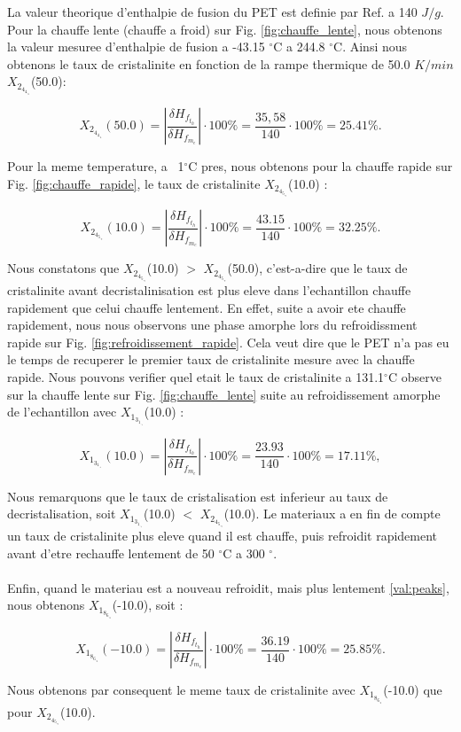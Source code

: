 La valeur theorique d'enthalpie de fusion du PET est definie par Ref. \cite{petnet} a 140 $J/g$. Pour la chauffe lente (chauffe a froid) sur Fig. \ref{fig:chauffe_lente}, nous obtenons la valeur mesuree d'enthalpie de fusion a -43.15 $^\circ$C a 244.8 $^\circ$C. Ainsi nous obtenons le taux de cristalinite en fonction de la rampe thermique de 50.0 $K/min$ $X_2_4_4_._8$(50.0):

\[
	X_2_4_4_._8(50.0) = |\frac{\delta H_f_t_h}{\delta H_f_m_e}| \cdot 100\% = \frac{35,58}{140} \cdot 100 \% = 25.41 \%.
\]

Pour la meme temperature, a ~1$^\circ$C pres, nous obtenons pour la chauffe rapide sur Fig. \ref{fig:chauffe_rapide}, le taux de cristalinite $X_2_4_5_._9$(10.0) :

\[
	X_2_4_5_._9(10.0) = |\frac{\delta H_f_t_h}{\delta H_f_m_e}| \cdot 100\% = \frac{43.15}{140} \cdot 100\% = 32.25 \%.
\]

Nous constatons que $X_2_4_5_._9$(10.0) $>$ $X_2_4_5_._9$(50.0), c'est-a-dire que le taux de cristalinite avant decristalinisation est plus eleve dans l'echantillon chauffe rapidement que celui chauffe lentement. En effet, suite a avoir ete chauffe rapidement, nous nous observons une phase amorphe lors du refroidissment rapide sur Fig. \ref{fig:refroidissement_rapide}. Cela veut dire que le PET n'a pas eu le temps de recuperer le premier taux de cristalinite mesure avec la chauffe rapide. Nous pouvons verifier quel etait le taux de cristalinite a 131.1$^\circ$C observe sur la chauffe lente sur Fig. \ref{fig:chauffe_lente} suite au refroidissement amorphe de l'echantillon avec $X_1_3_1_._1$(10.0) :


\[
	X_1_3_1_._1(10.0) = |\frac{\delta H_f_t_h}{\delta H_f_m_e}| \cdot 100\% = \frac{23.93}{140} \cdot 100\% = 17.11 \%,
\]

Nous remarquons que le taux de cristalisation est inferieur au taux de decristalisation, soit $X_1_3_1_._1$(10.0) $<$ $X_2_4_5_._9$(10.0). Le materiaux a en fin de compte un taux de cristalinite plus eleve quand il est chauffe, puis refroidit rapidement avant d'etre rechauffe lentement de 50 $^\circ$C a 300 $^\circ$.
\\\\
Enfin, quand le materiau est a nouveau refroidit, mais plus lentement \ref{val:peaks}, nous obtenons $X_1_8_6_._8$(-10.0), soit : 

\[
        X_1_8_6_._8(-10.0) = |\frac{\delta H_f_t_h}{\delta H_f_m_e}| \cdot 100\% = \frac{36.19}{140} \cdot 100\% = 25.85 \%.
\]

Nous obtenons par consequent le meme taux de cristalinite avec $X_1_8_6_._8$(-10.0) que pour $X_2_4_5_._9$(10.0).

